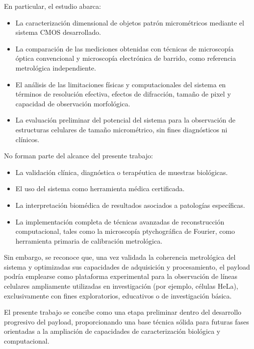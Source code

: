 En particular, el estudio abarca:

\begin{itemize}
    \item La caracterización dimensional de objetos patrón micrométricos mediante el sistema CMOS desarrollado.
    
    \item La comparación de las mediciones obtenidas con técnicas de microscopía óptica convencional y microscopía electrónica de barrido, como referencia metrológica independiente.
    
    \item El análisis de las limitaciones físicas y computacionales del sistema en términos de resolución efectiva, efectos de difracción, tamaño de pixel y capacidad de observación morfológica.
    
    \item La evaluación preliminar del potencial del sistema para la observación de estructuras celulares de tamaño micrométrico, sin fines diagnósticos ni clínicos.
\end{itemize}

No forman parte del alcance del presente trabajo:

\begin{itemize}
    \item La validación clínica, diagnóstica o terapéutica de muestras biológicas.
    
    \item El uso del sistema como herramienta médica certificada.
    
    \item La interpretación biomédica de resultados asociados a patologías específicas.
    
    \item La implementación completa de técnicas avanzadas de reconstrucción computacional, tales como la microscopía ptychográfica de Fourier, como herramienta primaria de calibración metrológica.
\end{itemize}

Sin embargo, se reconoce que, una vez validada la coherencia metrológica del sistema y optimizadas sus capacidades de adquisición y procesamiento, el payload podría emplearse como plataforma experimental para la observación de líneas celulares ampliamente utilizadas en investigación (por ejemplo, células HeLa), exclusivamente con fines exploratorios, educativos o de investigación básica.

El presente trabajo se concibe como una etapa preliminar dentro del desarrollo progresivo del payload, proporcionando una base técnica sólida para futuras fases orientadas a la ampliación de capacidades de caracterización biológica y computacional.
